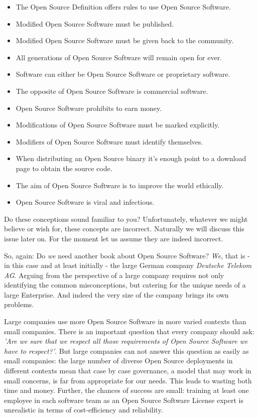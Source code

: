 \begin{itemize}
  \item The Open Source Definition offers rules to use Open Source Software.
  \item Modified Open Source Software must be published.
  \item Modified Open Source Software must be given back to the community.
  \item All generations of Open Source Software will remain open for ever.
  \item Software can either be Open Source Software or proprietary software.
  \item The opposite of Open Source Software is commercial software.
  \item Open Source Software prohibits to earn money.
  \item Modifications of Open Source Software must be marked explicitly.
  \item Modifiers of Open Source Software must identify themselves.
  \item When distributing an Open Source binary it’s enough point to a download
  page to obtain the source code.
  \item The aim of Open Source Software is to improve the world ethically.
  \item Open Source Software is viral and infectious.
\end{itemize}

Do these conceptions sound familiar to you? Unfortunately, whatever we might
believe or wish for, these concepts are incorrect. Naturally we will discuss
this issue later on. For the moment let us assume they are indeed
incorrect.

So, again: Do \emph{we} need another book about Open Source Software? \emph{We},
that is - in this case and at least initially - the large German company
\textit{Deutsche Telekom AG}. Arguing from the perspective of a large company
requires not only identifying the common misconceptions, but catering for the
unique needs of a large Enterprise. And indeed the very size of the company
brings its own problems.

Large companies use more Open Source Software in more varied contexts than small
companies. There is an important question that every company should ask:
\emph{'Are we sure that we respect all those requirements of Open Source
Software we have to respect?'}. But large companies can not answer this question
as easily as small companies: the large number of diverse Open Source
deployments in different contexts mean that case by case governance, a model
that may work in small concerns, is far from appropriate for our needs. This
leads to wasting both time and money. Further, the chances of success are small:
training at least one employee in each software team as an Open Source Software
License expert is unrealistic in terms of cost-efficiency and reliability.

